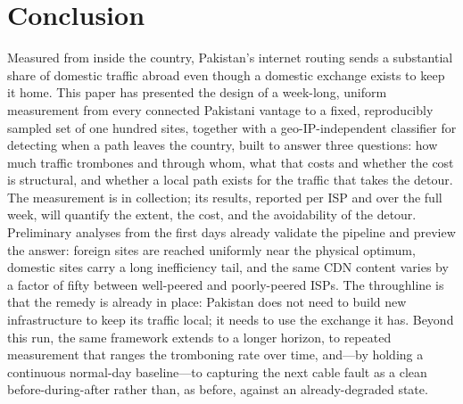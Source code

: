 \documentclass[sigconf,anonymous,10pt]{acmart}
\begin{document}
\section{Conclusion}
Measured from inside the country, Pakistan's internet routing sends a substantial share of domestic
traffic abroad even though a domestic exchange exists to keep it home. This paper has presented the
design of a week-long, uniform measurement from every connected Pakistani vantage to a fixed,
reproducibly sampled set of one hundred sites, together with a geo-IP-independent classifier for
detecting when a path leaves the country, built to answer three questions: how much traffic
trombones and through whom, what that costs and whether the cost is structural, and whether a local
path exists for the traffic that takes the detour. The measurement is in collection; its results,
reported per ISP and over the full week, will quantify the extent, the cost, and the avoidability of
the detour. Preliminary analyses from the first days already validate the pipeline and preview the
answer: foreign sites are reached uniformly near the physical optimum, domestic sites carry a long
inefficiency tail, and the same CDN content varies by a factor of fifty between well-peered and
poorly-peered ISPs. The throughline is that the remedy is already in place: Pakistan does not need
to build new infrastructure to keep its traffic local; it needs to use the exchange it has. Beyond
this run, the same framework extends to a longer horizon, to repeated measurement that ranges the
tromboning rate over time, and---by holding a continuous normal-day baseline---to capturing the
next cable fault as a clean before-during-after rather than, as before, against an already-degraded
state.



\end{document}

